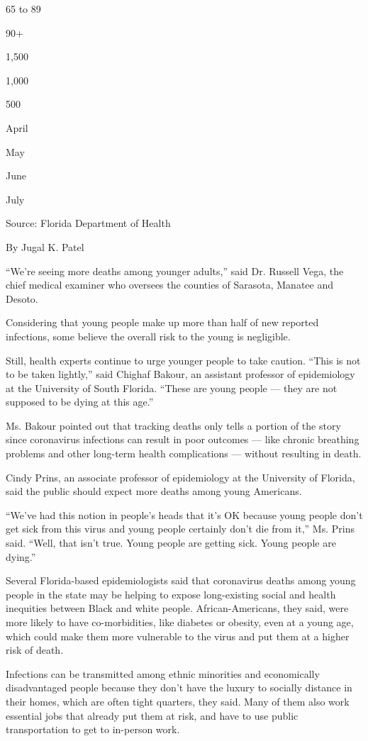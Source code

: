 65 to 89

90+

1,500

1,000

500

April

May

June

July

Source: Florida Department of Health

By Jugal K. Patel

``We're seeing more deaths among younger adults,'' said Dr. Russell
Vega, the chief medical examiner who oversees the counties of Sarasota,
Manatee and Desoto.

Considering that young people make up more than half of new reported
infections, some believe the overall risk to the young is negligible.

Still, health experts continue to urge younger people to take caution.
``This is not to be taken lightly,'' said Chighaf Bakour, an assistant
professor of epidemiology at the University of South Florida. ``These
are young people --- they are not supposed to be dying at this age.''

Ms. Bakour pointed out that tracking deaths only tells a portion of the
story since coronavirus infections can result in poor outcomes --- like
chronic breathing problems and other long-term health complications ---
without resulting in death.

Cindy Prins, an associate professor of epidemiology at the University of
Florida, said the public should expect more deaths among young
Americans.

``We've had this notion in people's heads that it's OK because young
people don't get sick from this virus and young people certainly don't
die from it,'' Ms. Prins said. ``Well, that isn't true. Young people are
getting sick. Young people are dying.''

Several Florida-based epidemiologists said that coronavirus deaths among
young people in the state may be helping to expose long-existing social
and health inequities between Black and white people. African-Americans,
they said, were more likely to have co-morbidities, like diabetes or
obesity, even at a young age, which could make them more vulnerable to
the virus and put them at a higher risk of death.

Infections can be transmitted among ethnic minorities and economically
disadvantaged people because they don't have the luxury to socially
distance in their homes, which are often tight quarters, they said. Many
of them also work essential jobs that already put them at risk, and have
to use public transportation to get to in-person work.

